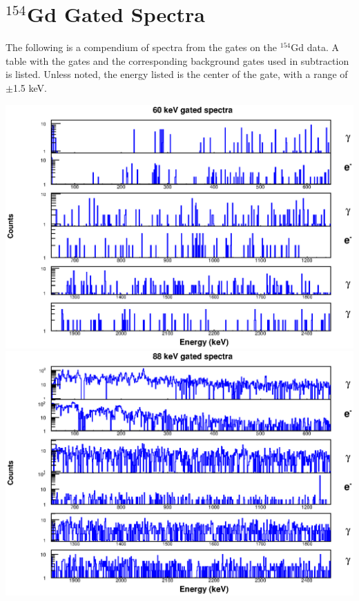 
\chapter{$^{154}$Gd Gated Spectra}
\label{chap:154_spectra}

The following is a compendium of spectra from the gates on the $^{154}$Gd data. A table with the gates and the corresponding background gates used in subtraction is listed. Unless noted, the energy listed is the center of the gate, with a range of $\pm$1.5 keV.



\includegraphics[scale=0.8]{154Gd_Appendix/60_combined.eps}
\includegraphics[scale=0.8]{154Gd_Appendix/88_combined.eps}
